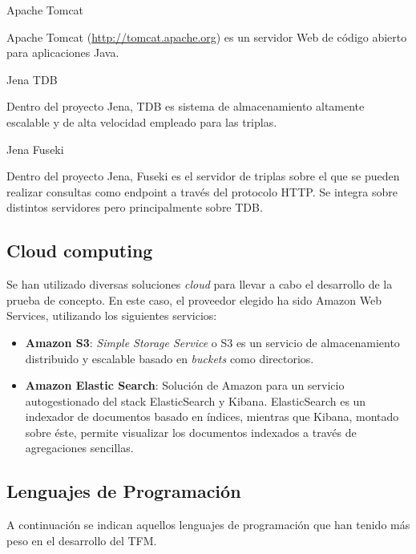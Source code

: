 \begin{definitionlist} 
\item[Apache Tomcat]

Apache Tomcat (\url{http://tomcat.apache.org}) es un servidor Web de código
abierto para aplicaciones Java. 

\item[Jena TDB]

Dentro del proyecto Jena, TDB es sistema de almacenamiento altamente escalable y
de alta velocidad empleado para las triplas. 


\item[Jena Fuseki]

Dentro del proyecto Jena, Fuseki es el servidor de triplas sobre el que se
pueden realizar consultas como endpoint a través del protocolo \acs{HTTP}. Se
integra sobre distintos servidores pero principalmente sobre TDB. 

\end{definitionlist}

\subsection{Cloud computing}

Se han utilizado diversas soluciones \textit{cloud} para llevar a cabo el
desarrollo de la prueba de concepto. En este caso, el proveedor elegido ha sido
Amazon Web Services, utilizando los siguientes servicios:

\begin{itemize}

\item \textbf{Amazon S3}: \textit{Simple Storage Service} o S3 es un servicio de almacenamiento
  distribuido y escalable basado en \textit{buckets} como directorios.
  
\item \textbf{Amazon Elastic Search}: Solución de Amazon para un servicio autogestionado del stack ElasticSearch y
  Kibana. ElasticSearch es un indexador de documentos basado en índices,
  mientras que Kibana, montado sobre éste, permite visualizar los documentos
  indexados a través de agregaciones sencillas. 
\end{itemize}

\subsection{Lenguajes de Programación}

A continuación se indican aquellos lenguajes de programación que han tenido más
peso en el desarrollo del \acs{TFM}. 

